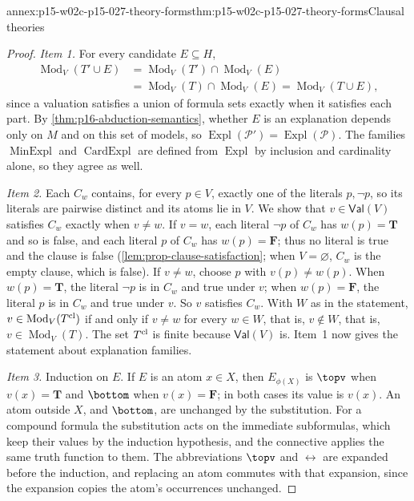 \begin{annexitem}{annex:p15-w02c-p15-027-theory-forms}{thm:p15-w02c-p15-027-theory-forms}{Clausal theories}
\begin{proof}
\emph{Item 1.} For every candidate \(E\subseteq H\),
\[
\begin{aligned}
 \operatorname{Mod}_V(T'\cup E)
   &=\operatorname{Mod}_V(T')\cap\operatorname{Mod}_V(E)\\
   &=\operatorname{Mod}_V(T)\cap\operatorname{Mod}_V(E)
   =\operatorname{Mod}_V(T\cup E),
\end{aligned}
\]
since a valuation satisfies a union of formula sets exactly when it
satisfies each part. By \cref{thm:p16-abduction-semantics}, whether \(E\)
is an explanation depends only on \(M\) and on this set of models, so
\(\operatorname{Expl}(\mathcal P')=\operatorname{Expl}(\mathcal P)\).
The families \(\operatorname{MinExpl}\) and \(\operatorname{CardExpl}\)
are defined from \(\operatorname{Expl}\) by inclusion and cardinality
alone, so they agree as well.

\emph{Item 2.} Each \(C_w\) contains, for every \(p\in V\), exactly one of
the literals \(p,\neg p\), so its literals are pairwise distinct and its
atoms lie in \(V\). We show that \(v\in\mathsf{Val}(V)\) satisfies \(C_w\)
exactly when \(v\ne w\). If \(v=w\), each literal \(\neg p\) of \(C_w\) has
\(w(p)=\mathbf T\) and so is false, and each literal \(p\) of \(C_w\) has
\(w(p)=\mathbf F\); thus no literal is true and the clause is false
(\cref{lem:prop-clause-satisfaction}; when \(V=\varnothing\), \(C_w\) is
the empty clause, which is false). If \(v\ne w\), choose \(p\) with
\(v(p)\ne w(p)\). When \(w(p)=\mathbf T\), the literal \(\neg p\) is in
\(C_w\) and true under \(v\); when \(w(p)=\mathbf F\), the literal \(p\) is
in \(C_w\) and true under \(v\). So \(v\) satisfies \(C_w\).
With \(W\) as in the statement, \(v\in\operatorname{Mod}_V(T^{\rm cl})\) if and only if \(v\ne w\)
for every \(w\in W\), that is, \(v\notin W\), that is,
\(v\in\operatorname{Mod}_V(T)\). The set \(T^{\rm cl}\) is finite because
\(\mathsf{Val}(V)\) is. Item~1 now gives the statement about explanation
families.

\emph{Item 3.} Induction on \(E\). If \(E\) is an atom \(x\in X\), then
\(E_{\phi(X)}\) is \(\topv\) when \(v(x)=\mathbf T\) and \(\bottom\) when
\(v(x)=\mathbf F\); in both cases its value is \(v(x)\). An atom outside
\(X\), and \(\bottom\), are unchanged by the substitution. For a compound
formula the substitution acts on the immediate subformulas, which keep
their values by the induction hypothesis, and the connective applies the
same truth function to them. The abbreviations \(\topv\) and
\(\leftrightarrow\) are expanded before the induction, and replacing an atom
commutes with that expansion, since the expansion copies the atom's
occurrences unchanged.


\end{proof}
\end{annexitem}
